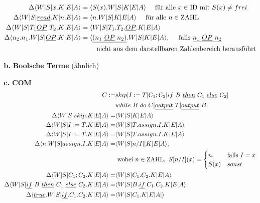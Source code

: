 \begin{enumerate}
\begin{itemize}
\begin{align*}
	\Delta\langle W|S|x.K|E|A\rangle &= \langle S(x).W|S|K|E|A\rangle \quad\text{ für alle }x\in \text{\lstinline!ID!} \text{ mit }S(x)\neq frei\\
	\Delta\langle W|S|\underline{read}.K|n.E|A\rangle &= \langle n.W|S|K|E|A\rangle \quad\text{ für alle }n\in \text{\lstinline!ZAHL!}\\
	\Delta\langle W|S|T_1 \underline{OP}\ T_2.K|E|A\rangle &= \langle W|S|T_1.T_2.\underline{OP}.K|E|A\rangle\\
	\Delta\langle n_2.n_1.W|S|\underline{OP}.K|E|A\rangle &= \langle \underline{(n_1\ \underline{OP}\ n_2)}.W|S|K|E|A\rangle, \quad\text{ falls }\underline{n_1\ \underline{OP}\ n_2} \\& \quad\quad\text{ nicht aus dem darstellbaren Zahlenbereich herausführt}\\
				\end{align*}
	\item[\textbf{b.}] \textbf{Boolsche Terme} (ähnlich)
	\item[\textbf{c.}] \textbf{COM}
\begin{align*}
C:=&\underline{skip}|I:=T|C_1;C_2|\underline{if}\ B\ \underline{then}\ C_1\ \underline{else}\ C_2| \\&\underline{while}\ B\  \underline{do}\ C| \underline{output}\ T|\underline{output}\ B\\
\Delta\langle W|S|skip.K|E|A\rangle = &\langle W|S|K|E|A\rangle \\
\Delta\langle W|S|I:=T.K|E|A\rangle = &\langle W|S|T.assign.I.K|E|A\rangle\\
\Delta\langle W|S|I:=T.K|E|A\rangle = &\langle W|S|T.assign.I.K|E|A\rangle\\
\Delta\langle n.W|S|assign.I.K|E|A\rangle = &\langle W|S[n/I]|K|E|A\rangle,\\& \text{ wobei } n\in \text{\lstinline!ZAHL!},\ S[n/I](x) = 
\begin{cases} 
	n,&\text{falls }I =x\\
	S(x)& sonst\\
\end{cases} \\
\Delta\langle W|S|C_1;C_2.K|E|A\rangle = & \langle W|S|C_1.C_2.K|E|A\rangle \\
\Delta\langle W|S|\underline{if}\ B\ \underline{then}\ C_1\ \underline{else}\ C_2.K|E|A\rangle = & \langle W|S|B.\underline{if}.C_1.C_2.K|E|A\rangle \\
\Delta\langle \underline{true}.W|S|\underline{if}.C_1.C_2.K|E|A\rangle = & \langle W|S|C_1.K|E|A|\rangle \\

\end{align*}
\end{itemize}
\end{enumerate}
